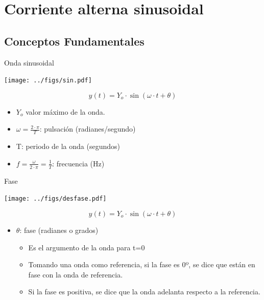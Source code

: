 \documentclass[xcolor={usenames,svgnames,dvipsnames}]{beamer}
\begin{document}
\section{Corriente alterna sinusoidal}
\label{sec:orge1095b6}

\subsection{Conceptos Fundamentales}
\label{sec:orgcebb126}

\begin{frame}[label={sec:org538d10f}]{Onda sinusoidal}
\begin{center}
\texttt{[image: ../figs/sin.pdf]}
\end{center}


\[
y(t)=Y_{o}\cdot\sin(\omega\cdot t+\theta)
\]

\begin{itemize}
\item \(Y_{o}\) valor máximo de la onda.

\item \(\omega=\frac{2\cdot\pi}{T}\): pulsación (radianes/segundo)

\item T: periodo de la onda (segundos)

\item \(f=\frac{\omega}{2\cdot\pi}=\frac{1}{T}\): frecuencia (Hz)
\end{itemize}
\end{frame}


\begin{frame}[label={sec:orgf08f150}]{Fase}
\begin{center}
\texttt{[image: ../figs/desfase.pdf]}
\end{center}


\[
y(t)=Y_{o}\cdot\sin(\omega\cdot t+\theta)
\]

\begin{itemize}
\item \(\theta\): fase (radianes o grados)

\begin{itemize}
\item Es el argumento de la onda para t=0

\item Tomando una onda como referencia, si la fase es 0º, se dice que
están en fase con la onda de referencia.

\item Si la fase es positiva, se dice que la onda adelanta
respecto a la referencia.
\end{itemize}
\end{itemize}
\end{frame}
\end{document}
